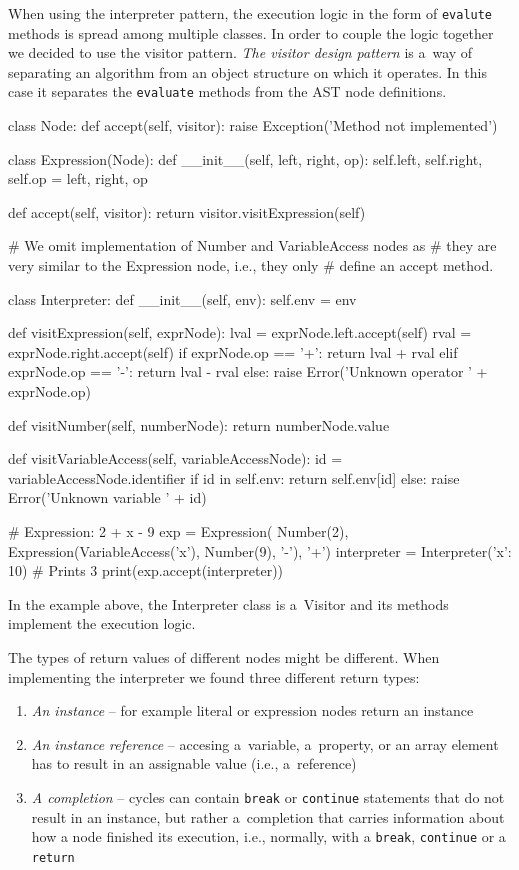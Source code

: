 When using the interpreter pattern, the execution logic in the form of \texttt{evalute} methods is spread among multiple classes. In order to couple the
logic together we decided to use the visitor pattern. \emph{The visitor design pattern} is a~way of separating an algorithm from an object structure on
which it operates. In this case it separates the \texttt{evaluate} methods from the AST node definitions.
\begin{code}
class Node:
    def accept(self, visitor):
        raise Exception('Method not implemented')

class Expression(Node):
    def __init__(self, left, right, op):
        self.left, self.right, self.op = left, right, op

    def accept(self, visitor):
        return visitor.visitExpression(self)

# We omit implementation of Number and VariableAccess nodes as
# they are very similar to the Expression node, i.e., they only
# define an accept method.

class Interpreter:
    def __init__(self, env):
        self.env = env
    
    def visitExpression(self, exprNode):
        lval = exprNode.left.accept(self)
        rval = exprNode.right.accept(self)
        if exprNode.op == '+':
            return lval + rval
        elif exprNode.op == '-':
            return lval - rval
        else:
            raise Error('Unknown operator ' + exprNode.op)
    
    def visitNumber(self, numberNode):
        return numberNode.value
    
    def visitVariableAccess(self, variableAccessNode):
        id = variableAccessNode.identifier
        if id in self.env:
            return self.env[id]
        else:
            raise Error('Unknown variable ' + id)

# Expression: 2 + x - 9
exp = Expression(
    Number(2),
    Expression(VariableAccess('x'), Number(9), '-'),
    '+')
interpreter = Interpreter({'x': 10})
# Prints 3
print(exp.accept(interpreter))
\end{code}

In the example above, the Interpreter class is a~Visitor and its methods implement the execution logic.

The types of return values of different nodes might be different. When implementing the interpreter we found three different return types:
\begin{enumerate}
    \item \emph{An instance} -- for example literal or expression nodes return an instance
    \item \emph{An instance reference} -- accesing a~variable, a~property, or an array element has to result in an assignable value (i.e., a~reference)
    \item \emph{A completion} -- cycles can contain \texttt{break} or \texttt{continue} statements that do not result in an instance, but rather a~completion
        that carries information about how a node finished its execution, i.e., normally, with a \texttt{break}, \texttt{continue} or a \texttt{return}
\end{enumerate} 

